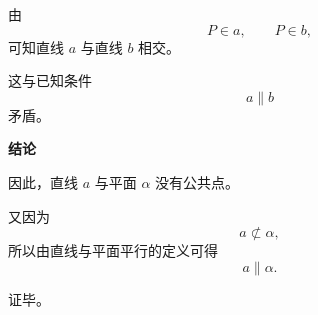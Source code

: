 \begin{proofbox}
\begin{description}[
        style=nextline,
        leftmargin=2.8em,
        labelsep=0.5em,
        itemsep=0.55em
    ]
        \item[\textbf{步骤四（推出矛盾）：}]
        由
        \[
            P\in a,
            \qquad
            P\in b,
        \]
        可知直线 $a$ 与直线 $b$ 相交。

        这与已知条件
        \[
            a\parallel b
        \]
        矛盾。
    \end{description}

    \medskip
    \textbf{\textcolor{CProof}{结论}}

    因此，直线 $a$ 与平面 $\alpha$ 没有公共点。

    又因为
    \[
        a\not\subset\alpha,
    \]
    所以由直线与平面平行的定义可得
    \[
        a\parallel\alpha.
    \]

    证毕。
\end{proofbox}